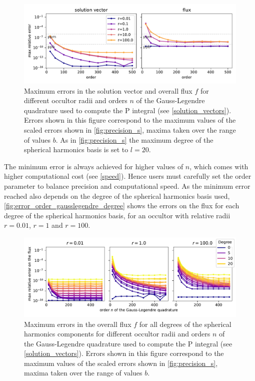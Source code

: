 \documentclass[modern]{aastex631}
\begin{document}
\begin{figure}[H]
    \begin{center}
        \includegraphics[width=\textwidth]{../workflows/precision/figures/error_order.pdf}
        \caption{Maximum errors in the solution vector and overall flux $f$ for different occultor radii and orders $n$ of the Gauss-Legendre quadrature used to compute the P integral (see \autoref{solution_vectors}). Errors shown in this figure correspond to the maximum values of the scaled errors shown in \autoref{fig:precision_s}, maxima taken over the range of values $b$. As in \autoref{fig:precision_s} the maximum degree of the spherical harmonics basis is set to $l=20$.}
        \label{fig:error_order_gausslegendre}
    \end{center}
\end{figure}
The minimum error is always achieved for higher values of $n$, which comes with higher computational cost (see \autoref{speed}). Hence users must carefully set the order parameter to balance precision and computational speed. As the minimum error reached also depends on the degree of the spherical harmonics basis used, \autoref{fig:error_order_gausslegendre_degree} shows the errors on the flux for each degree of the spherical harmonics basis, for an occultor with relative radii $r=0.01$, $r=1$ and $r=100$.
\begin{figure}[H]
    \begin{center}
        \includegraphics[width=\textwidth]{../workflows/precision/figures/error_order_degree.pdf}
        \caption{Maximum errors in the overall flux $f$ for all degrees of the spherical harmonics components for different occultor radii and orders $n$ of the Gauss-Legendre quadrature used to compute the P integral (see \autoref{solution_vectors}). Errors shown in this figure correspond to the maximum values of the scaled errors shown in \autoref{fig:precision_s}, maxima taken over the range of values $b$.}
        \label{fig:error_order_gausslegendre_degree}
    \end{center}
\end{figure}
\end{document}

